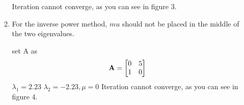 \documentclass[english,onecolumn]{IEEEtran}
\newcommand{\bA}{{\bf A}}
\begin{document}
\begin{enumerate}
\begin{enumerate}
	Iteration cannot converge, as you can see in figure 3.
	
	\item For the inverse power method, $mu$ should not be placed in the middle of the two eigenvalues.
	
	set A as \[
	\bA = \begin{bmatrix}
		0 & 5 \\
		1 & 0
	\end{bmatrix}\,
	\]
	$\lambda_1 = 2.23$ $\lambda_2 = -2.23, \mu = 0$  
	Iteration cannot converge, as you can see in figure 4.

	
\end{enumerate}




\end{enumerate}


\newpage 
\end{document}
